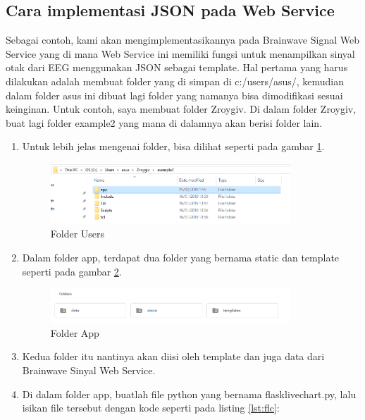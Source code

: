 \subsection{Cara implementasi JSON pada Web Service}
Sebagai contoh, kami akan mengimplementasikannya pada Brainwave Signal Web Service yang di mana Web Service ini memiliki fungsi untuk menampilkan sinyal otak dari EEG menggunakan JSON sebagai template. Hal pertama yang harus dilakukan adalah membuat folder yang di simpan di c:/users/asus/, kemudian dalam folder asus ini dibuat lagi folder yang namanya bisa dimodifikasi sesuai keinginan. Untuk contoh, saya membuat folder Zroygiv. Di dalam folder Zroygiv, buat lagi folder example2 yang mana di dalamnya akan berisi folder lain.
\begin{enumerate}
\item Untuk lebih jelas mengenai folder, bisa dilihat seperti pada gambar \ref{fig:fu}.
\begin{figure}[!htbp]
	\centerline{\includegraphics[width=0.85\textwidth]{figures/12/fu.PNG}}
	\caption{Folder Users}
	\label{fig:fu}
\end{figure}

\item Dalam folder app, terdapat dua folder yang bernama static dan template seperti pada gambar \ref{fig:fa}.
\begin{figure}[!htbp]
	\centerline{\includegraphics[width=0.85\textwidth]{figures/12/fa.PNG}}
	\caption{Folder App}
	\label{fig:fa}
\end{figure}

\item Kedua folder itu nantinya akan diisi oleh template dan juga data dari Brainwave Sinyal Web Service. 
\item Di dalam folder app, buatlah file python yang bernama flasklivechart.py, lalu isikan file tersebut dengan kode seperti pada listing \ref{lst:flc}:

\end{enumerate}


